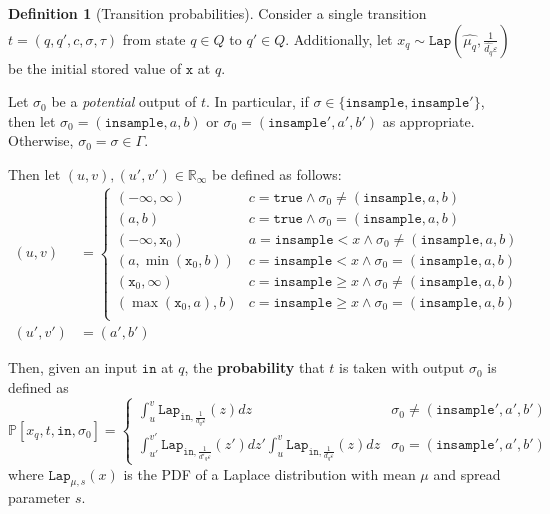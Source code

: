 \documentclass[12pt]{article}
\newcommand{\RR}{\mathbb{R}}
\newcommand{\PP}{\mathbb{P}}
\newcommand{\gguard}[1][x]{\texttt{insample}\geq #1}
\newcommand{\lguard}[1][x]{\texttt{insample} < #1}
\newcommand{\Lap}{\texttt{Lap}}
\theoremstyle{definition}
\newtheorem{defn}[thm]{Definition}
\begin{document}
\begin{defn}[Transition probabilities]
    Consider a single transition $t=(q, q', c, \sigma, \tau)$ from state $q\in Q$ to $q'\in Q$. Additionally, let $x_q\sim \Lap(\hat{\mu_q}, \frac{1}{\hat{d_q}\varepsilon})$ be the initial stored value of $\texttt{x}$ at $q$. 

    Let $\sigma_0$ be a \textit{potential} output of $t$. In particular, if $\sigma\in \{\texttt{insample}, \texttt{insample}'\}$, then let $\sigma_0 = (\texttt{insample}, a, b)$ or $\sigma_0 = (\texttt{insample}', a', b')$ as appropriate. Otherwise, $\sigma_0 = \sigma\in \Gamma$. 
    
    Then let $(u, v), (u', v')\in \RR_{\infty}$ be defined as follows:
    \begin{align*}
        (u, v) &= \begin{cases}
        (-\infty, \infty) & c=\texttt{true}\land \sigma_0 \neq (\texttt{insample}, a, b)\\
        (a, b) &c=\texttt{true}\land \sigma_0 = (\texttt{insample}, a, b)\\
        (-\infty, \texttt{x}_0) & a=\lguard\land \sigma_0 \neq (\texttt{insample}, a, b)\\
        (a, \min(\texttt{x}_0, b)) &c=\lguard\land \sigma_0 = (\texttt{insample}, a, b)\\
        (\texttt{x}_0, \infty) & c=\gguard\land \sigma_0 \neq (\texttt{insample}, a, b)\\
        (\max(\texttt{x}_0, a),b) &c=\gguard\land \sigma_0 = (\texttt{insample}, a, b)\\
    \end{cases}\\
    (u', v')& = (a', b')\end{align*}

    Then, given an input $\texttt{in}$ at $q$, the \textbf{probability} that $t$ is taken with output $\sigma_0$ is defined as \[
        \PP[x_q, t, \texttt{in}, \sigma_0] = \begin{cases}
            \int_u^v \Lap_{\texttt{in}, \frac{1}{d_q\varepsilon}}(z)dz & \sigma_0 \neq (\texttt{insample}', a', b') \\
            \int_{u'}^{v'}\Lap_{\texttt{in}, \frac{1}{d'_q\varepsilon}}(z')dz'\int_u^v \Lap_{\texttt{in}, \frac{1}{d_q\varepsilon}}(z)dz& \sigma_0 = (\texttt{insample}', a', b')
        \end{cases}
    \]
    where $\Lap_{\mu, s}(x)$ is the PDF of a Laplace distribution with mean $\mu$ and spread parameter $s$.
\end{defn}
\end{document}
